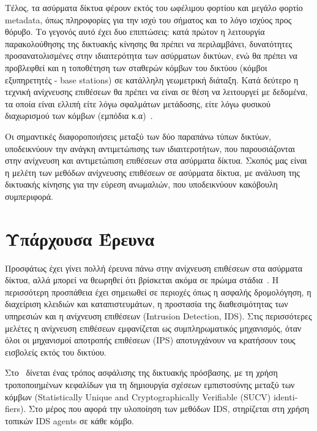 \documentclass[12pt]{report}
\begin{document}
Τέλος, τα ασύρματα δίκτυα φέρουν εκτός του ωφέλιμου φορτίου και μεγάλο φορτίο \textlatin{metadata}, όπως πληροφορίες για την ισχύ του σήματος και το λόγο ισχύος προς θόρυβο. Το γεγονός αυτό έχει δυο επιπτώσεις: κατά πρώτον η λειτουργία παρακολούθησης της δικτυακής κίνησης θα πρέπει να περιλαμβάνει, δυνατότητες προσανατολισμένες στην ιδιαιτερότητα των ασύρματων δικτύων, ενώ θα πρέπει να προβλεφθεί και η τοποθέτηση των σταθερών κόμβων του δικτύου (κόμβοι εξυπηρετητές - \textlatin{base stations}) σε κατάλληλη γεωμετρική διάταξη. Κατά δεύτερο η τεχνική ανίχνευσης επιθέσεων θα πρέπει να είναι σε θέση να λειτουργεί με δεδομένα, τα οποία είναι ελλιπή είτε λόγω σφαλμάτων μετάδοσης, είτε λόγω φυσικού διαχωρισμού των κόμβων (εμπόδια κ.α)~\cite{paper:12}.

Οι σημαντικές διαφοροποιήσεις μεταξύ των δύο παραπάνω τύπων δικτύων, υποδεικνύουν την ανάγκη αντιμετώπισης των ιδιαιτεροτήτων, που παρουσιάζονται στην ανίχνευση και αντιμετώπιση επιθέσεων στα ασύρματα δίκτυα. Σκοπός μας είναι η μελέτη των μεθόδων ανίχνευσης επιθέσεων σε ασύρματα δίκτυα, με ανάλυση της δικτυακής κίνησης για την εύρεση ανωμαλιών, που υποδεικνύουν κακόβουλη συμπεριφορά.

\section{Υπάρχουσα Έρευνα}
Προσφάτως έχει γίνει πολλή έρευνα πάνω στην ανίχνευση επιθέσεων στα ασύρματα δίκτυα, αλλά μπορεί να θεωρηθεί ότι βρίσκεται ακόμα σε πρώιμα στάδια~\cite{paper:03}. Η περισσότερη προσπάθεια έχει σημειωθεί σε περιοχές όπως η ασφαλής δρομολόγηση, η διαχείριση κλειδιών και καταπιστευμάτων, η προστασία της διαθεσιμότητας των υπηρεσιών και η ανίχνευση επιθέσεων (\textlatin{Intrusion Detection, IDS}). Στις περισσότερες μελέτες η ανίχνευση επιθέσεων εμφανίζεται ως συμπληρωματικός μηχανισμός, όταν όλοι οι μηχανισμοί αποτροπής επιθέσεων (\textlatin{IPS}) αποτυγχάνουν να κρατήσουν τους εισβολείς εκτός του δικτύου.

Στο~\cite{paper:01} δίνεται ένας τρόπος ασφάλισης της δικτυακής πρόσβασης, με τη χρήση τροποποιημένων κεφαλίδων για τη δημιουργία σχέσεων εμπιστοσύνης μεταξύ των κόμβων (\textlatin{Statistically Unique and Cryptographically Verifiable (SUCV) identifiers}). Στο μέρος που αφορά την υλοποίηση των μεθόδων \textlatin{IDS}, στηρίζεται στη χρήση τοπικών \textlatin{IDS agents} σε κάθε κόμβο.
\end{document}
